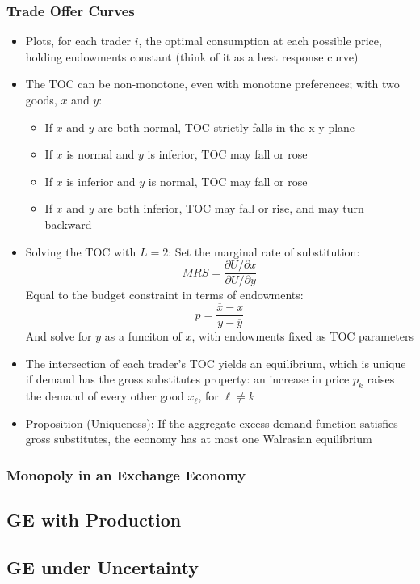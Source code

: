 \documentclass{article}
\newcommand{\olx}{\overline{x}}
\newcommand{\oly}{\overline{y}}
\newcommand{\blue}[1]{{\color{blue}#1}}
\begin{document}
\subsubsection{Trade Offer Curves}
\begin{itemize}
	\item Plots, for each trader $i$, the optimal consumption at each possible price, holding endowments constant (think of it as a best response curve)
	\item The TOC can be non-monotone, even with monotone preferences; with two goods, $x$ and $y$:
		\begin{itemize}
			\item If $x$ and $y$ are both normal, TOC strictly falls in the x-y plane
			\item If $x$ is normal and $y$ is inferior, TOC may fall or rose
			\item If $x$ is inferior and $y$ is normal, TOC may fall or rose
			\item If $x$ and $y$ are both inferior, TOC may fall or rise, and may turn backward
		\end{itemize}
	\item \blue{Solving the TOC with $L=2$:} Set the marginal rate of substitution: 
		\[
			MRS = \frac{\partial U/\partial x}{\partial U/\partial y}
		\]
		Equal to the budget constraint in terms of endowments:
		\[
			p = \frac{\olx - x}{y-\oly}
		\]
		And solve for $y$ as a funciton of $x$, with endowments fixed as TOC parameters
	\item The intersection of each trader's TOC yields an equilibrium, which is unique if demand has the \blue{gross substitutes property}: an increase in price $p_k$ raises the demand of every other good $x_\ell$, for $\ell\neq k$
	\item \blue{Proposition (Uniqueness):} If the aggregate excess demand function satisfies gross substitutes, the economy has at most one Walrasian equilibrium
\end{itemize}

\subsubsection{Monopoly in an Exchange Economy}


\subsection{GE with Production}



\subsection{GE under Uncertainty}


\end{document}
